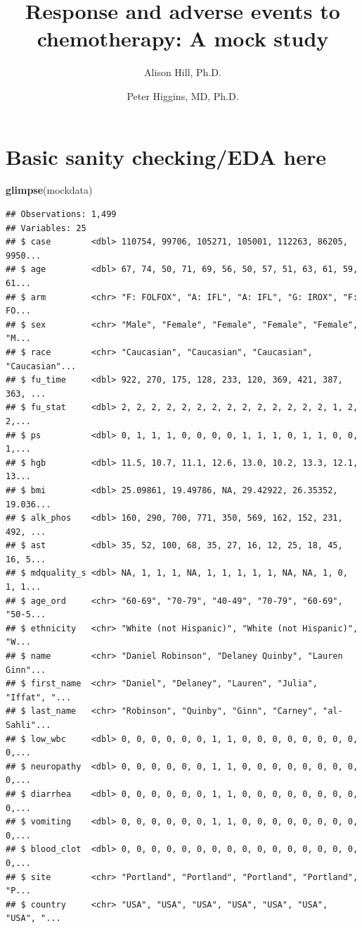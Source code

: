 \documentclass[fleqn,10pt,lineno]{wlpeerj} %
\title{Response and adverse events to chemotherapy: A mock study}
\author[RStudio]{Alison Hill, Ph.D.}
\author[University of Michigan]{Peter Higgins, MD, Ph.D.}
\newenvironment{Shaded}{\begin{snugshade}}{\end{snugshade}}
\newcommand{\KeywordTok}[1]{\textcolor[rgb]{0.13,0.29,0.53}{\textbf{#1}}}
\newcommand{\NormalTok}[1]{#1}
\begin{document}
\flushbottom
\maketitle
\thispagestyle{empty}

\hypertarget{basic-sanity-checkingeda-here}{%
\section{Basic sanity checking/EDA here}\label{basic-sanity-checkingeda-here}}

\begin{Shaded}
\begin{Highlighting}[]
\KeywordTok{glimpse}\NormalTok{(mockdata)}
\end{Highlighting}
\end{Shaded}

\begin{verbatim}
## Observations: 1,499
## Variables: 25
## $ case        <dbl> 110754, 99706, 105271, 105001, 112263, 86205, 9950...
## $ age         <dbl> 67, 74, 50, 71, 69, 56, 50, 57, 51, 63, 61, 59, 61...
## $ arm         <chr> "F: FOLFOX", "A: IFL", "A: IFL", "G: IROX", "F: FO...
## $ sex         <chr> "Male", "Female", "Female", "Female", "Female", "M...
## $ race        <chr> "Caucasian", "Caucasian", "Caucasian", "Caucasian"...
## $ fu_time     <dbl> 922, 270, 175, 128, 233, 120, 369, 421, 387, 363, ...
## $ fu_stat     <dbl> 2, 2, 2, 2, 2, 2, 2, 2, 2, 2, 2, 2, 2, 2, 1, 2, 2,...
## $ ps          <dbl> 0, 1, 1, 1, 0, 0, 0, 0, 1, 1, 1, 0, 1, 1, 0, 0, 1,...
## $ hgb         <dbl> 11.5, 10.7, 11.1, 12.6, 13.0, 10.2, 13.3, 12.1, 13...
## $ bmi         <dbl> 25.09861, 19.49786, NA, 29.42922, 26.35352, 19.036...
## $ alk_phos    <dbl> 160, 290, 700, 771, 350, 569, 162, 152, 231, 492, ...
## $ ast         <dbl> 35, 52, 100, 68, 35, 27, 16, 12, 25, 18, 45, 16, 5...
## $ mdquality_s <dbl> NA, 1, 1, 1, NA, 1, 1, 1, 1, 1, NA, NA, 1, 0, 1, 1...
## $ age_ord     <chr> "60-69", "70-79", "40-49", "70-79", "60-69", "50-5...
## $ ethnicity   <chr> "White (not Hispanic)", "White (not Hispanic)", "W...
## $ name        <chr> "Daniel Robinson", "Delaney Quinby", "Lauren Ginn"...
## $ first_name  <chr> "Daniel", "Delaney", "Lauren", "Julia", "Iffat", "...
## $ last_name   <chr> "Robinson", "Quinby", "Ginn", "Carney", "al-Sahli"...
## $ low_wbc     <dbl> 0, 0, 0, 0, 0, 0, 1, 1, 0, 0, 0, 0, 0, 0, 0, 0, 0,...
## $ neuropathy  <dbl> 0, 0, 0, 0, 0, 0, 1, 1, 0, 0, 0, 0, 0, 0, 0, 0, 0,...
## $ diarrhea    <dbl> 0, 0, 0, 0, 0, 0, 1, 1, 0, 0, 0, 0, 0, 0, 0, 0, 0,...
## $ vomiting    <dbl> 0, 0, 0, 0, 0, 0, 1, 1, 0, 0, 0, 0, 0, 0, 0, 0, 0,...
## $ blood_clot  <dbl> 0, 0, 0, 0, 0, 0, 0, 0, 0, 0, 0, 0, 0, 0, 0, 0, 0,...
## $ site        <chr> "Portland", "Portland", "Portland", "Portland", "P...
## $ country     <chr> "USA", "USA", "USA", "USA", "USA", "USA", "USA", "...
\end{verbatim}
\end{document}
